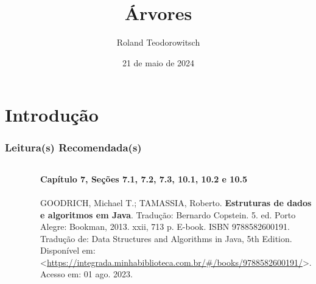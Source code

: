 \documentclass[aspectratio=169]{beamer}
\title[\sc{Árvores}]{Árvores}
\author[Roland Teodorowitsch]{Roland Teodorowitsch}
\institute[ALEST I - EP - PUCRS]{Algoritmos e Estruturas de Dados I - Escola Politécnica - PUCRS}
\date{21 de maio de 2024}
\begin{document}
\justifying

\begin{frame}
	\titlepage
\end{frame}

\section{Introdução}

\begin{frame}\frametitle{Leitura(s) Recomendada(s)}

\begin{columns}[T]
\begin{column}{0.15\linewidth}
\vspace{-3mm}
\begin{figure}[h]
	\centering
	\includegraphics[height=0.3\paperheight]{imagens/livro_goodrich.jpg}
\end{figure}
\end{column}
\begin{column}{0.85\linewidth}
\tiny{\textbf{Capítulo 7, Seções 7.1, 7.2, 7.3, 10.1, 10.2 e 10.5}\\
~}\\
\scriptsize{GOODRICH, Michael T.; TAMASSIA, Roberto. \textbf{Estruturas de dados e algoritmos em Java}. Tradução: Bernardo Copstein. 5. ed. Porto Alegre: Bookman, 2013. xxii, 713 p. E-book. ISBN 9788582600191. Tradução de: Data Structures and Algorithms in Java, 5th Edition. Disponível em: \textless{}\url{https://integrada.minhabiblioteca.com.br/\#/books/9788582600191/}\textgreater{}. Acesso em: 01 ago. 2023.}
\end{column}
\end{columns}

\end{frame}

\end{document}
